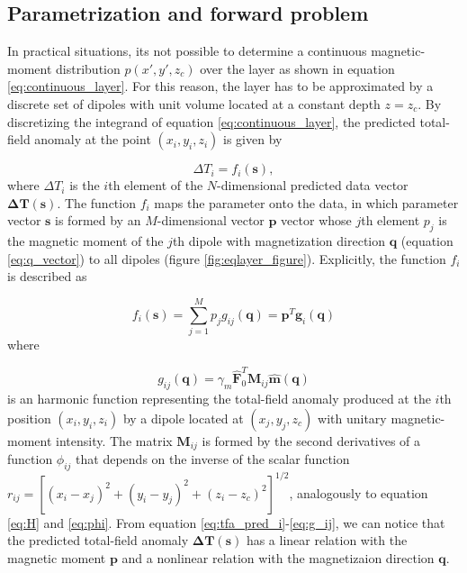 \subsection{Parametrization and forward problem}

In practical situations, its not possible to determine a continuous magnetic-moment distribution $p(x',y',z_c)$ over the layer as shown in equation \ref{eq:continuous_layer}. For this reason, the layer has to be approximated by a discrete set of dipoles with unit volume located at a constant depth $z = z_c$. By discretizing the integrand of equation \ref{eq:continuous_layer}, the predicted total-field anomaly at the point $(x_i,y_i,z_i)$ is given by 

\begin{equation}
\Delta T_i = f_i(\mathbf{s}) ,
\label{eq:tfa_pred_i}
\end{equation}    
where $\Delta T_i$ is the $i$th element of the $N$-dimensional predicted data vector $\mathbf{\Delta T}(\mathbf{s})$. The function $f_i$ maps the parameter onto the data, in which parameter vector $\mathbf{s}$ is formed by an $M$-dimensional vector $\mathbf{p}$ vector whose $j$th element $p_j$ is the magnetic moment of the $j$th dipole with magnetization direction $\mathbf{q}$ (equation \ref{eq:q_vector}) to all dipoles (figure \ref{fig:eqlayer_figure}). Explicitly, the function $f_i$ is described as 

\begin{equation}
f_i (\mathbf{s}) = \sum_{j=1}^{M} p_j g_{ij} (\mathbf{q}) = \mathbf{p}^T \mathbf{g}_i(\mathbf{q})
\label{eq:f_i}
\end{equation}
where

\begin{equation}
g_{ij} (\mathbf{q})  = \gamma_m \hat{\mathbf{F}}_0^T \mathbf{M}_{ij} \hat{\mathbf{m}}(\mathbf{q})
\label{eq:g_ij}
\end{equation}
is an harmonic function representing the total-field anomaly produced at the $i$th position $(x_i,y_i,z_i)$ by a dipole located at $(x_j,y_j,z_c)$ with unitary magnetic-moment intensity. The matrix $\mathbf{M}_{ij}$ is formed by the second derivatives of a function $\phi_{ij}$ that depends on the inverse of the scalar function $r_{ij} = [(x_i-x_j)^2 + (y_i-y_j)^2 + (z_i-z_c)^2]^{1/2}$, analogously to equation \ref{eq:H} and \ref{eq:phi}. From equation \ref{eq:tfa_pred_i}-\ref{eq:g_ij}, we can notice that the predicted total-field anomaly $\mathbf{\Delta T} (\mathbf{s})$ has a linear relation with the magnetic moment $\mathbf{p}$ and a nonlinear relation with the magnetizaion direction $\mathbf{q}$.    

